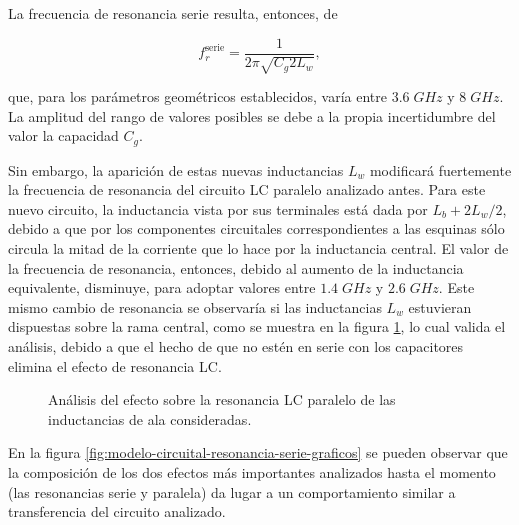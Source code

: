 La frecuencia de resonancia serie resulta, entonces, de

\begin{equation}
	f_r^{\text{serie}} = \frac{1}{2\pi \sqrt{C_g 2 L_w}},
\end{equation}

que, para los parámetros geométricos establecidos, varía entre $3.6\;GHz$ y $8\;GHz$. La amplitud del rango de valores posibles se debe a la propia incertidumbre del valor la capacidad $C_g$.

Sin embargo, la aparición de estas nuevas inductancias $L_{w}$ modificará fuertemente la frecuencia de resonancia del circuito LC paralelo analizado antes. Para este nuevo circuito, la inductancia vista por sus terminales está dada por $L_{b}+2 L_{w}/2$, debido a que por los componentes circuitales correspondientes a las esquinas sólo circula la mitad de la corriente que lo hace por la inductancia central. El valor de la frecuencia de resonancia, entonces, debido al aumento de la inductancia equivalente, disminuye, para adoptar valores entre $1.4\;GHz$ y $2.6\;GHz$. Este mismo cambio de resonancia se observaría si las inductancias $L_w$ estuvieran dispuestas sobre la rama central, como se muestra en la figura \ref{fig:res-serie-p21p22}, lo cual valida el análisis, debido a que el hecho de que no estén en serie con los capacitores elimina el efecto de resonancia LC.

\begin{figure}[H]
	\centering 
	\hspace{0pt}
	\caption{Análisis del efecto sobre la resonancia LC paralelo de las inductancias de ala consideradas.}
	\label{fig:res-serie-p21p22}
\end{figure}

En la figura \ref{fig:modelo-circuital-resonancia-serie-graficos} se pueden observar que la composición de los dos efectos más importantes analizados hasta el momento (las resonancias serie y paralela) da lugar a un comportamiento similar a transferencia del circuito analizado.

